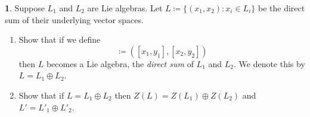 \documentclass[12pt]{article}
\theoremstyle{definition}
\newtheorem{ex}{}
\begin{document}
\begin{ex}
	Suppose $L_1$ and $L_2$ are Lie algebras.
	Let $L \coloneq \lbrace (x_1, x_2) : x_i \in L_i \rbrace$ be the direct sum of their underlying vector spaces. \begin{enumerate}[label=(\alph*)]
		\item Show that if we define \begin{equation*}
			      [(x_1, x_2), (y_1, y_2)] \coloneq ([x_1, y_1], [x_2, y_2])
		      \end{equation*}
		      then $L$ becomes a Lie algebra, the \textit{direct sum} of $L_1$ and $L_2$.
		      We denote this by $L = L_1 \oplus L_2$.
		\item Show that if $L = L_1 \oplus L_2$ then $Z(L) = Z(L_1) \oplus Z(L_2)$ and $L' = L'_1 \oplus L'_2$.
	\end{enumerate}
\end{ex}
\end{document}
